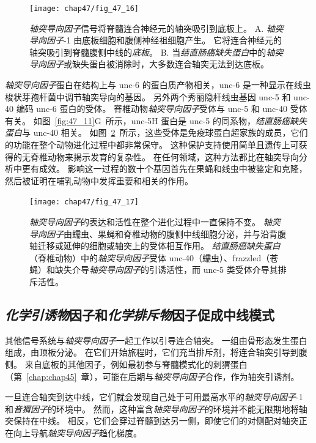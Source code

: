 \begin{figure}[htbp]
	\centering
	\texttt{[image: chap47/fig\_47\_16]}
	\caption{\textit{轴突导向因子}信号将脊髓连合神经元的轴突吸引到底板上。
		A. \textit{轴突导向因子}-1 由底板细胞和腹侧神经祖细胞产生。
		它将连合神经元的轴突吸引到脊髓腹侧中线的\textit{底板}。
		B. 当\textit{结直肠癌缺失蛋白}中的\textit{轴突导向因子}或缺失蛋白被消除时，大多数连合轴突无法到达底板。}
	\label{fig:47_16}
\end{figure}


\textit{轴突导向因子}蛋白在结构上与 unc-6 的蛋白质产物相关，unc-6 是一种显示在线虫梭状芽孢杆菌中调节轴突导向的基因。
另外两个秀丽隐杆线虫基因 unc-5 和 unc-40 编码 unc-6 蛋白的受体。
脊椎动物\textit{轴突导向因子}受体与 unc-5 和 unc-40 受体有关。
如图~\ref{fig:47_11}G~所示，unc-5H 蛋白是 unc-5 的同系物，\textit{结直肠癌缺失蛋白}与 unc-40 相关。
如图~\ref{fig:47_17}~所示，这些受体是免疫球蛋白超家族的成员，它们的功能在整个动物进化过程中都非常保守。
这种保护支持使用简单且遗传上可获得的无脊椎动物来揭示发育的复杂性。
在任何领域，这种方法都比在轴突导向分析中更有成效。
影响这一过程的数十个基因首先在果蝇和线虫中被鉴定和克隆，然后被证明在哺乳动物中发挥重要和相关的作用。


\begin{figure}[htbp]
	\centering
	\texttt{[image: chap47/fig\_47\_17]}
	\caption{\textit{轴突导向因子}的表达和活性在整个进化过程中一直保持不变。
		\textit{轴突导向因子}由蠕虫、果蝇和脊椎动物的腹侧中线细胞分泌，并与沿背腹轴迁移或延伸的细胞或轴突上的受体相互作用。
		\textit{结直肠癌缺失蛋白}（脊椎动物）中的\textit{轴突导向因子}受体 unc-40（蠕虫）、frazzled（苍蝇）和缺失介导\textit{轴突导向因子}的引诱活性，而 unc-5 类受体介导其排斥活性。}
	\label{fig:47_17}
\end{figure}



\subsection{\textit{化学引诱物}因子和\textit{化学排斥物}因子促成中线模式}

其他信号系统与\textit{轴突导向因子}一起工作以引导连合轴突。
一组由骨形态发生蛋白组成，由顶板分泌。
在它们开始旅程时，它们充当排斥剂，将连合轴突引导到腹侧。
来自底板的其他因子，例如最初参与脊髓模式化的刺猬蛋白（第~\ref{chap:chap45}~章），可能在后期与\textit{轴突导向因子}合作，作为轴突引诱剂。


一旦连合轴突到达中线，它们就会发现自己处于可用最高水平的\textit{轴突导向因子}-1 和\textit{音猬因子}的环境中。
然而，这种富含\textit{轴突导向因子}的环境并不能无限期地将轴突保持在中线。
相反，它们会穿过脊髓到达另一侧，即使它们的对侧配对轴突正在向上导航\textit{轴突导向因子}趋化梯度。


